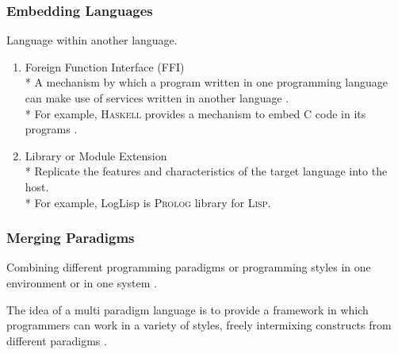 \documentclass[aspectratio=1610]{beamer}
\begin{document}


\begin{frame}
\frametitle{Embedding Languages}

Language within another language.

\begin{enumerate}
\item Foreign Function Interface (FFI)
 \\* A mechanism by which a program written in one programming language can make use of services written in another language \cite{ffiwiki}. 
\\* For example, \textsc{Haskell} provides a mechanism to embed \textsc{C} code in its programs \cite{ffihaskwiki}.

\item Library or Module Extension
\\* Replicate the features and characteristics of the target language into the host. 
\\* For example, LogLisp \cite{loglisp} is \textsc{Prolog} library for \textsc{Lisp}. 
\end{enumerate}

\end{frame}


\begin{frame}
\frametitle{Merging Paradigms}
Combining different programming paradigms or programming styles in one environment or in one system \cite{jerinic1993perspective}.

\hspace{5mm}

The idea of a multi paradigm language is to provide a framework in which programmers can work in a variety of styles, freely
intermixing constructs from different paradigms \cite{progparawiki}.
\end{frame}

\end{document}
